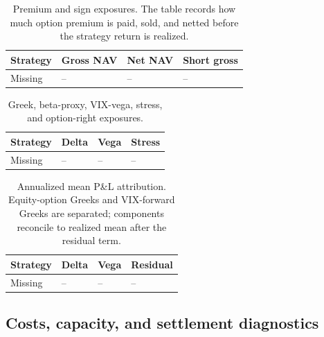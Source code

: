 \begin{table}[H]
\centering
\scriptsize
{}
  {\resizebox{0.92\textwidth}{!}{}}
  {\begin{tabular}{llll}\toprule Strategy & Gross NAV & Net NAV & Short gross \\\midrule Missing & -- & -- & -- \\\bottomrule\end{tabular}}
\caption{Premium and sign exposures. The table records how much option premium is paid,
sold, and netted before the strategy return is realized.}
\label{tab:premium_exposure_app}
\end{table}

\begin{table}[H]
\centering
\scriptsize
{}
  {\resizebox{\textwidth}{!}{}}
  {\begin{tabular}{llll}\toprule Strategy & Delta & Vega & Stress \\\midrule Missing & -- & -- & -- \\\bottomrule\end{tabular}}
\caption{Greek, beta-proxy, VIX-vega, stress, and option-right exposures.}
\label{tab:greek_exposure_app}
\end{table}

\begin{table}[H]
\centering
\scriptsize
{}
  {\resizebox{\textwidth}{!}{}}
  {\begin{tabular}{llll}\toprule Strategy & Delta & Vega & Residual \\\midrule Missing & -- & -- & -- \\\bottomrule\end{tabular}}
\caption{Annualized mean P\&L attribution. Equity-option Greeks and VIX-forward Greeks
are separated; components reconcile to realized mean after the residual term.}
\label{tab:pnl_attribution_app}
\end{table}

\subsection{Costs, capacity, and settlement diagnostics}

